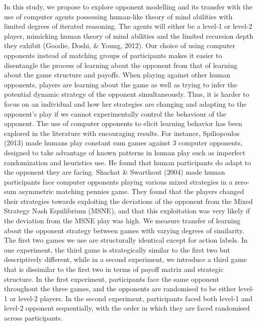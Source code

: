 \documentclass[man,floatsintext]{apa6}
\begin{document}
In this study, we propose to explore opponent modelling and its transfer with the use of computer agents possessing human-like theory of mind abilities with limited degrees of iterated reasoning. The agents will either be a level-1 or level-2 player, mimicking human theory of mind abilities and the limited recursion depth they exhibit (Goodie, Doshi, \& Young, 2012). Our choice of using computer opponents instead of matching groups of participants makes it easier to disentangle the process of learning about the opponent from that of learning about the game structure and payoffs. When playing against other human opponents, players are learning about the game as well as trying to infer the potential dynamic strategy of the opponent simultaneously. Thus, it is harder to focus on an individual and how her strategies are changing and adapting to the opponent's play if we cannot experimentally control the behaviour of the opponent. The use of computer opponents to elicit learning behavior has been explored in the literature with encouraging results. For instance, Spiliopoulos (2013) made humans play constant sum games against 3 computer opponents, designed to take advantage of known patterns in human play such as imperfect randomization and heuristics use. He found that human participants do adapt to the opponent they are facing. Shachat \& Swarthout (2004) made human participants face computer opponents playing various mixed strategies in a zero-sum asymmetric matching pennies game. They found that the players changed their strategies towards exploiting the deviations of the opponent from the Mixed Strategy Nash Equilibrium (MSNE), and that this exploitation was very likely if the deviation from the MSNE play was high.
We measure transfer of learning about the opponent strategy between games with varying degrees of similarity. The first two games we use are structurally identical except for action labels. In one experiment, the third game is strategically similar to the first two but descriptively different, while in a second experiment, we introduce a third game that is dissimilar to the first two in terms of payoff matrix and strategic structure. In the first experiment, participants face the same opponent throughout the three games, and the opponents are randomised to be either level-1 or level-2 players. In the second experiment, participants faced both level-1 and level-2 opponent sequentially, with the order in which they are faced randomised across participants.

\newpage
\end{document}
